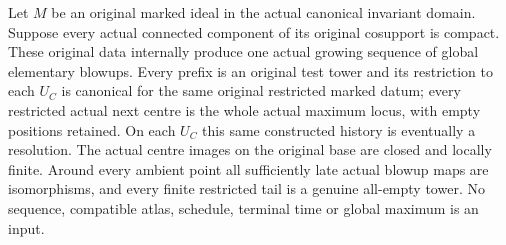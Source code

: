 \begin{theorem}
\label{hir:original-compact-support-components-actual-history}
\leanok
Let $M$ be an original marked ideal in the actual canonical invariant
domain. Suppose every actual connected component of its original
cosupport is compact. These original data internally produce one
actual growing sequence of global elementary blowups. Every prefix is
an original test tower and its restriction to each $U_C$ is canonical
for the same original restricted marked datum; every restricted actual
next centre is the whole actual maximum locus, with empty positions
retained. On each $U_C$ this same constructed history is eventually a
resolution. The actual centre images on the original base are closed
and locally finite. Around every ambient point all sufficiently late
actual blowup maps are isomorphisms, and every finite restricted tail
is a genuine all-empty tower. No sequence, compatible atlas, schedule,
terminal time or global maximum is an input.
\end{theorem}
